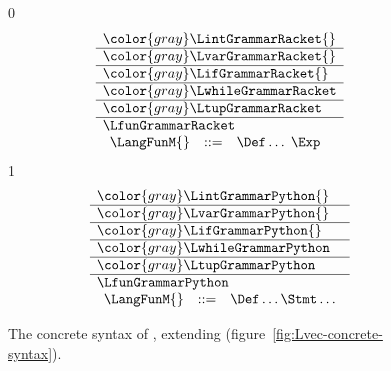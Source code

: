 \documentclass[7x10]{TimesAPriori_MIT}%
\newcommand{\gray}[1]{{\color{gray} #1}}
\def\racketEd{0}
\def\pythonEd{1}
\def\edition{0}
\numberwithin{theorem}{chapter}
\numberwithin{definition}{chapter}
\numberwithin{equation}{chapter}
\begin{document}
\begin{figure}[tp]
\centering
\begin{tcolorbox}[colback=white]
    \small
{\if\edition\racketEd    
\[
\begin{array}{l}
  \gray{\LintGrammarRacket{}} \\ \hline
  \gray{\LvarGrammarRacket{}} \\ \hline
  \gray{\LifGrammarRacket{}} \\ \hline
  \gray{\LwhileGrammarRacket} \\ \hline
  \gray{\LtupGrammarRacket} \\   \hline
  \LfunGrammarRacket \\  
  \begin{array}{lcl}
  \LangFunM{} &::=& \Def \ldots \; \Exp
  \end{array}
\end{array}
\]
\fi}
{\if\edition\pythonEd
\[
\begin{array}{l}
  \gray{\LintGrammarPython{}} \\ \hline
  \gray{\LvarGrammarPython{}} \\ \hline
  \gray{\LifGrammarPython{}} \\ \hline
  \gray{\LwhileGrammarPython} \\ \hline
  \gray{\LtupGrammarPython} \\  \hline
  \LfunGrammarPython \\
\begin{array}{rcl}
  \LangFunM{} &::=& \Def\ldots \Stmt\ldots
\end{array}
\end{array}
\]
\fi}
\end{tcolorbox}

\caption{The concrete syntax of \LangFun{}, extending \LangVec{} (figure~\ref{fig:Lvec-concrete-syntax}).}
\label{fig:Lfun-concrete-syntax}
\end{figure}
\end{document}
